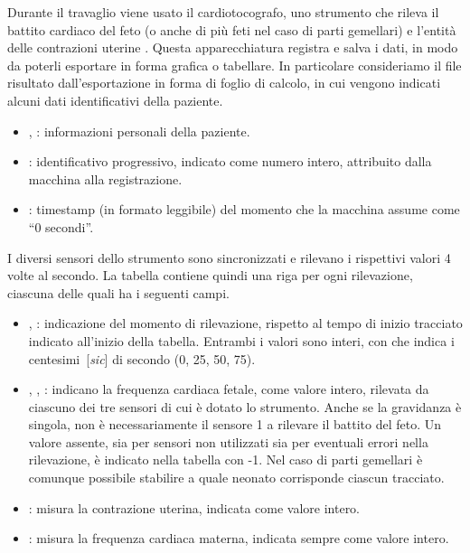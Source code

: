 Durante il travaglio viene usato il cardiotocografo, uno strumento che rileva il battito cardiaco del feto (o anche di più feti nel caso di parti gemellari) e l'entità delle contrazioni uterine \cite{Ayr18}.
Questa apparecchiatura registra e salva i dati, in modo da poterli esportare in forma grafica o tabellare.
In particolare consideriamo il file risultato dall'esportazione in forma di foglio di calcolo, in cui vengono indicati alcuni dati identificativi della paziente.

\begin{itemize}
\item {}, : informazioni personali della paziente.
\item {}: identificativo progressivo, indicato come numero intero, attribuito dalla macchina alla registrazione.
\item {}: timestamp (in formato leggibile) del momento che la macchina assume come \enquote{0 secondi}.
\end{itemize}

I diversi sensori dello strumento sono sincronizzati e rilevano i rispettivi valori 4 volte al secondo.
La tabella contiene quindi una riga per ogni rilevazione, ciascuna delle quali ha i seguenti campi.

\begin{itemize}
\item {}, : indicazione del momento di rilevazione, rispetto al tempo di inizio tracciato indicato all'inizio della tabella. Entrambi i valori sono interi, con  che indica i centesimi~[\textit{sic}] di secondo (0, 25, 50, 75).
\item {}, , : indicano la frequenza cardiaca fetale, come valore intero, rilevata da ciascuno dei tre sensori di cui è dotato lo strumento. Anche se la gravidanza è singola, non è necessariamente il sensore 1 a rilevare il battito del feto. Un valore assente, sia per sensori non utilizzati sia per eventuali errori nella rilevazione, è indicato nella tabella con -1.
Nel caso di parti gemellari è comunque possibile stabilire a quale neonato corrisponde ciascun tracciato.
\item {}: misura la contrazione uterina, indicata come valore intero.
\item {}: misura la frequenza cardiaca materna, indicata sempre come valore intero.
\end{itemize}

